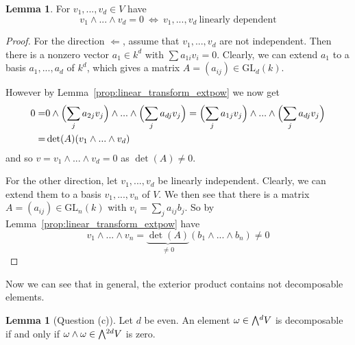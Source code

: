 \documentclass{scrartcl}
\newcommand{\GL}{\mathrm{GL}}
\newcommand{\extpow}{\mathchoice{{\textstyle\bigwedge}}
    {{\bigwedge}}
    {{\textstyle\wedge}}
    {{\scriptstyle\wedge}}}
\theoremstyle{definition}
\newtheorem{lemma}[subsection]{Lemma}
\begin{document}
\begin{lemma}
    \label{prop:extpow_zero_iff_independent}
    For $v_1, ..., v_d \in V$ have
    \begin{equation*}
        v_1 \wedge ... \wedge v_d = 0 \ \Leftrightarrow \ v_1, ..., v_d \ \text{linearly dependent}
    \end{equation*}
\end{lemma}
\begin{proof}
    For the direction $\Leftarrow$, assume that $v_1, ..., v_d$ are not independent. 
    Then there is a nonzero vector $a_1 \in k^d$ with $\sum a_{1i} v_i = 0$.
    Clearly, we can extend $a_1$ to a basis $a_1, ..., a_d$ of $k^d$, which gives a matrix $A = (a_{ij}) \in \GL_d(k)$.

    However by Lemma~\ref{prop:linear_transform_extpow} we now get
    \begin{align*}
        0 =& 0 \wedge \Bigl( \sum_j a_{2j} v_j \Bigr) \wedge ... \wedge \Bigl( \sum_j a_{dj} v_j \Bigr) = \Bigl( \sum_j a_{1j} v_j \Bigr) \wedge ... \wedge \Bigl( \sum_j a_{dj} v_j \Bigr) \\
        =& \det(A) (v_1 \wedge ... \wedge v_d)
    \end{align*}
    and so $v = v_1 \wedge ... \wedge v_d = 0$ as $\det(A) \neq 0$.

    For the other direction, let $v_1, ..., v_d$ be linearly independent.
    Clearly, we can extend them to a basis $v_1, ..., v_n$ of $V$.
    We then see that there is a matrix $A = (a_{ij}) \in \GL_n(k)$ with $v_i = \sum_j a_{ij} b_j$.
    So by Lemma~\ref{prop:linear_transform_extpow} have
    \begin{equation*}
        v_1 \wedge ... \wedge v_n = \underbrace{\det(A)}_{\neq 0} (b_1 \wedge ... \wedge b_n) \neq 0
    \end{equation*}
\end{proof}
Now we can see that in general, the exterior product contains not decomposable elements.
\begin{lemma}[Question (c)]
    \label{prop:characterization_decomposable_d_even}
    Let $d$ be even.
    An element $\omega \in \extpow^d V$ is decomposable if and only if $\omega \wedge \omega \in \extpow^{2d} V$ is zero.
\end{lemma}
\end{document}
